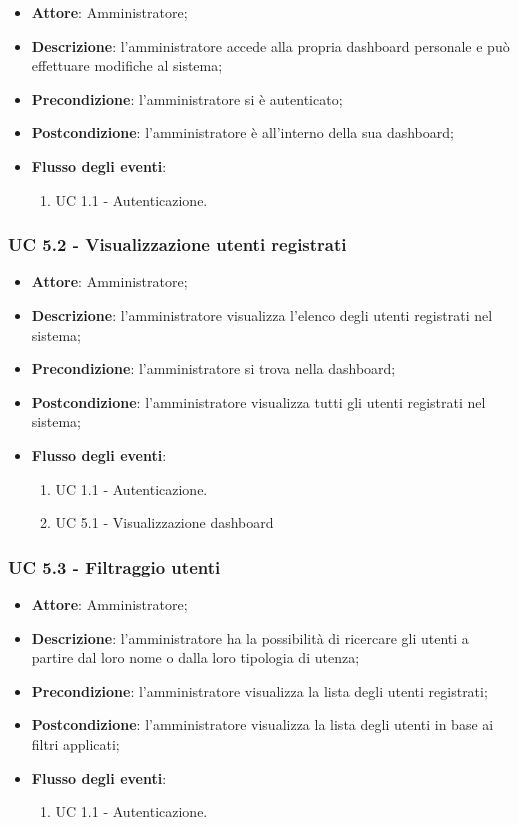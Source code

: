 \begin{itemize}
\item \textbf{Attore}: Amministratore; 
\item \textbf{Descrizione}: l'amministratore accede alla propria dashboard personale e può effettuare modifiche al sistema;
\item \textbf{Precondizione}: l'amministratore si è autenticato;
\item \textbf{Postcondizione}: l'amministratore è all'interno della sua dashboard;
\item \textbf{Flusso degli eventi}: 
\begin{enumerate}
	\item UC 1.1 - Autenticazione.
\end{enumerate}
\end{itemize}

\subsubsection{UC 5.2 - Visualizzazione utenti registrati}

\begin{itemize}
\item \textbf{Attore}: Amministratore;
\item \textbf{Descrizione}: l'amministratore visualizza l'elenco degli utenti registrati nel sistema;
\item \textbf{Precondizione}: l'amministratore si trova nella dashboard;
\item \textbf{Postcondizione}: l'amministratore visualizza tutti gli utenti registrati nel sistema;
\item \textbf{Flusso degli eventi}:
\begin{enumerate}
	\item UC 1.1 - Autenticazione.
	\item UC 5.1 - Visualizzazione dashboard
\end{enumerate}
\end{itemize}

\subsubsection{UC 5.3 - Filtraggio utenti}
\begin{itemize}
\item \textbf{Attore}: Amministratore;
\item \textbf{Descrizione}: l'amministratore ha la possibilità di ricercare gli utenti a partire dal loro nome o dalla loro tipologia di utenza;
\item \textbf{Precondizione}: l'amministratore visualizza la lista degli utenti registrati;
\item \textbf{Postcondizione}: l'amministratore visualizza la lista degli utenti in base ai filtri applicati;
\item \textbf{Flusso degli eventi}: 
\begin{enumerate}
	\item UC 1.1 - Autenticazione.
\end{enumerate}
\end{itemize}

